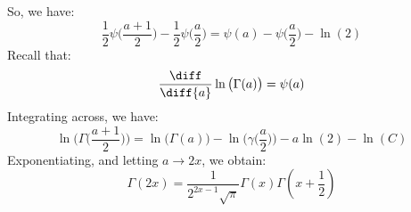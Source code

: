         So, we have:
        \begin{equation}
            \frac{1}{2}\psi\big(\frac{a+1}{2}\big)-
            \frac{1}{2}\psi\big(\frac{a}{2}\big)=
            \psi(a)-\psi\big(\frac{a}{2}\big)-\ln(2)
        \end{equation}
        Recall that:
        \begin{equation}
            \frac{\diff}{\diff{a}}\ln\big(\Gamma(a)\big)=
            \psi(a)
        \end{equation}
        Integrating across, we have:
        \begin{equation}
            \ln\Big(\Gamma\big(\frac{a+1}{2}\big)\Big)
            =\ln\big(\Gamma(a)\big)-
            \ln\Big(\gamma\big(\frac{a}{2}\big)\Big)-
            a\ln(2)-\ln(C)
        \end{equation}
        Exponentiating, and letting $a\rightarrow{2x}$, we obtain:
        \begin{equation}
            \Gamma(2x)=\frac{1}{2^{2x-1}\sqrt{\pi}}
            \Gamma(x)\Gamma(x+\frac{1}{2})
        \end{equation}
